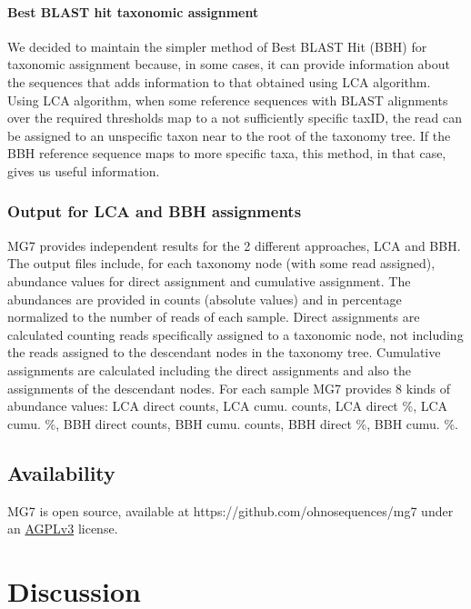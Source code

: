 \documentclass{frontiersSCNS} %
\begin{document}
\paragraph{Best BLAST hit taxonomic
assignment}\label{best-blast-hit-taxonomic-assignment}

We decided to maintain the simpler method of Best BLAST Hit (BBH) for
taxonomic assignment because, in some cases, it can provide information
about the sequences that adds information to that obtained using LCA
algorithm. Using LCA algorithm, when some reference sequences with BLAST
alignments over the required thresholds map to a not sufficiently
specific taxID, the read can be assigned to an unspecific taxon near to
the root of the taxonomy tree. If the BBH reference sequence maps to
more specific taxa, this method, in that case, gives us useful
information.

\subsubsection{Output for LCA and BBH
assignments}\label{output-for-lca-and-bbh-assignments}

MG7 provides independent results for the 2 different approaches, LCA and
BBH. The output files include, for each taxonomy node (with some read
assigned), abundance values for direct assignment and cumulative
assignment. The abundances are provided in counts (absolute values) and
in percentage normalized to the number of reads of each sample. Direct
assignments are calculated counting reads specifically assigned to a
taxonomic node, not including the reads assigned to the descendant nodes
in the taxonomy tree. Cumulative assignments are calculated including
the direct assignments and also the assignments of the descendant nodes.
For each sample MG7 provides 8 kinds of abundance values: LCA direct
counts, LCA cumu. counts, LCA direct \%, LCA cumu. \%, BBH direct
counts, BBH cumu. counts, BBH direct \%, BBH cumu. \%.

\subsection{Availability}\label{availability}

MG7 is open source, available at https://github.com/ohnosequences/mg7
under an \href{http://www.gnu.org/licenses/agpl-3.0.en.html}{AGPLv3}
license.

\section{Discussion}\label{discussion}
\end{document}
